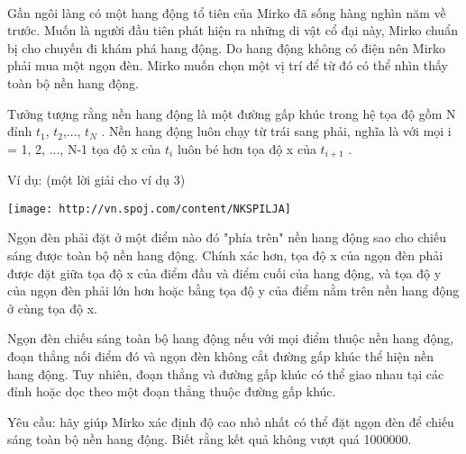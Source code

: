  

Gần ngôi làng có một hang động tổ tiên của Mirko đã sống hàng nghìn năm về trước. Muốn là người đầu tiên phát hiện ra những di vật cổ đại này, Mirko chuẩn bị cho chuyến đi khám phá hang động. Do hang động không có điện nên Mirko phải mua một ngọn đèn. Mirko muốn chọn một vị trí để từ đó có thể nhìn thấy toàn bộ nền hang động.

Tưởng tượng rằng nền hang động là một đường gấp khúc trong hệ tọa độ gồm N đỉnh $t_{1}$, $t_{2}$,..., $t_{N}$ . Nền hang động luôn chạy từ trái sang phải, nghĩa là với mọi i = 1, 2, ..., N-1 tọa độ x của $t_{i}$ luôn bé hơn tọa độ x của $t_{i+1}$ .

Ví dụ: (một lời giải cho ví dụ 3)


\texttt{[image: http://vn.spoj.com/content/NKSPILJA]}

Ngọn đèn phải đặt ở một điểm nào đó "phía trên" nền hang động sao cho chiếu sáng được toàn bộ nền hang động. Chính xác hơn, tọa độ x của ngọn đèn phải được đặt giữa tọa độ x của điểm đầu và điểm cuối của hang động, và tọa độ y của ngọn đèn phải lớn hơn hoặc bằng tọa độ y của điểm nằm trên nền hang động ở cùng tọa độ x.

Ngọn đèn chiếu sáng toàn bộ hang động nếu với mọi điểm thuộc nền hang động, đoạn thẳng nối điểm đó và ngọn đèn không cắt đường gấp khúc thể hiện nền hang động. Tuy nhiên, đoạn thẳng và đường gấp khúc có thể giao nhau tại các đỉnh hoặc dọc theo một đoạn thẳng thuộc đường gấp khúc.

Yêu cầu: hãy giúp Mirko xác định độ cao nhỏ nhất có thể đặt ngọn đèn để chiếu sáng toàn bộ nền hang động. Biết rằng kết quả không vượt quá 1000000.